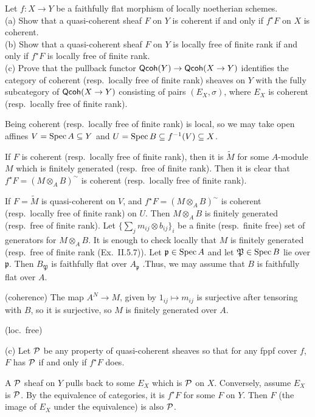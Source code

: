 \begin{exercise}[3.2]
  Let $f:X\to Y$ be a faithfully flat morphism of locally noetherian schemes.\\
  (a) Show that a quasi-coherent sheaf $F$ on $Y$ is coherent if and only if $f^\star F$
  on $X$ is coherent.\\
  (b) Show that a quasi-coherent sheaf $F$ on $Y$ is locally free of finite rank if and
  only if $f^\star F$ is locally free of finite rank.\\
  (c) Prove that the pullback functor $\qco(Y)\to \qco(X\to Y)$ identifies the category
  of coherent (resp.~locally free of finite rank) sheaves on $Y$ with the fully
  subcategory of $\qco(X\to Y)$ consisting of pairs $(E_X,\sigma)$, where $E_X$ is
  coherent (resp.~locally free of finite rank).
\end{exercise}
\begin{solution}
  Being coherent (resp.~locally free of finite rank) is local, so we may take open affines
  $V=\spec A\subseteq Y$ and $U=\spec B\subseteq f^{-1}(V)\subseteq X$.

  If $F$ is coherent (resp.~locally free of finite rank), then it is $\tilde M$ for some
  $A$-module $M$ which is finitely generated (resp.~free of finite rank). Then it is clear
  that $f^\star F=(M\otimes_A B)^\sim$ is coherent (resp.~locally free of finite rank).

  If $F=\tilde M$ is quasi-coherent on $V$, and $f^\star F=(M\otimes_A B)^\sim$ is coherent
  (resp.~locally free of finite rank) on $U$. Then $M\otimes_A B$ is finitely generated
  (resp.~free of finite rank). Let $\{\sum_j m_{ij}\otimes b_{ij}\}_i$ be a finite
  (resp.~finite free) set of generators for $M\otimes_A B$. It is enough to check locally
  that $M$ is finitely generated  (resp.~free of finite rank
  (Ex.~II.5.7)). Let $\mathfrak p \in \spec A$ and let $\mathfrak P\in \spec B$ lie over
  $\mathfrak p$. Then $B_\mathfrak P$ is faithfully flat over $A_\mathfrak p$ .Thus, we may assume that $B$ is faithfully flat over $A$.

  (coherence) The map $A^N\to M$, given by $1_{ij}\mapsto m_{ij}$ is
  surjective after tensoring with $B$, so it is surjective, so $M$ is finitely
  generated over $A$.

  (loc.~free)

  (c)  Let $\P$ be any property of quasi-coherent sheaves so that for any fppf cover
  $f$, $F$ has $\P$ if and only if $f^\star F$ does.

  A $\P$ sheaf on $Y$ pulls back to some $E_X$ which is $\P$ on $X$. Conversely, assume
  $E_X$ is $\P$. By the equivalence of categories, it is $f^\star F$ for some $F$ on
  $Y$. Then $F$ (the image of $E_X$ under the equivalence) is also $\P$.
\end{solution}


